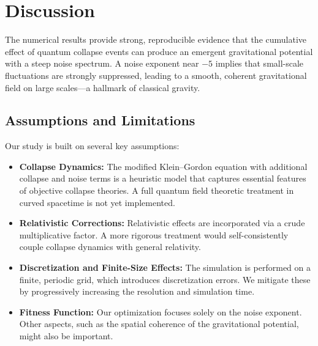 \documentclass[11pt,a4paper]{article}
\begin{document}
\section{Discussion}
The numerical results provide strong, reproducible evidence that the cumulative effect of quantum collapse events can produce an emergent gravitational potential with a steep noise spectrum. A noise exponent near $-5$ implies that small-scale fluctuations are strongly suppressed, leading to a smooth, coherent gravitational field on large scales---a hallmark of classical gravity.

\subsection{Assumptions and Limitations}
Our study is built on several key assumptions:
\begin{itemize}
    \item \textbf{Collapse Dynamics:} The modified Klein--Gordon equation with additional collapse and noise terms is a heuristic model that captures essential features of objective collapse theories. A full quantum field theoretic treatment in curved spacetime is not yet implemented.
    \item \textbf{Relativistic Corrections:} Relativistic effects are incorporated via a crude multiplicative factor. A more rigorous treatment would self-consistently couple collapse dynamics with general relativity.
    \item \textbf{Discretization and Finite-Size Effects:} The simulation is performed on a finite, periodic grid, which introduces discretization errors. We mitigate these by progressively increasing the resolution and simulation time.
    \item \textbf{Fitness Function:} Our optimization focuses solely on the noise exponent. Other aspects, such as the spatial coherence of the gravitational potential, might also be important.
\end{itemize}
\end{document}
